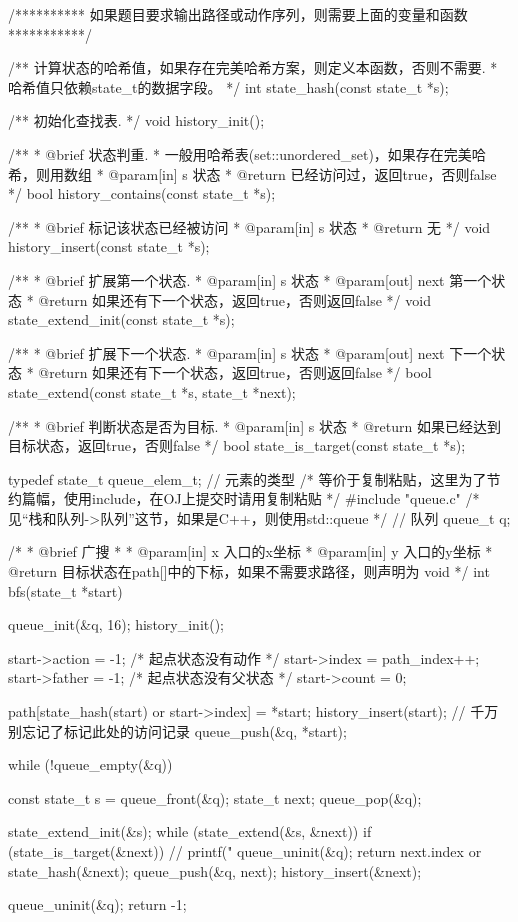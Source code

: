 \begin{Codex}[label=bfs_template.c]
/********** 如果题目要求输出路径或动作序列，则需要上面的变量和函数 ***********/

/** 计算状态的哈希值，如果存在完美哈希方案，则定义本函数，否则不需要.
 * 哈希值只依赖state_t的数据字段。
 */
int state_hash(const state_t *s);

/** 初始化查找表. */
void history_init();

/**
 * @brief 状态判重.
 * 一般用哈希表(set::unordered_set)，如果存在完美哈希，则用数组
 * @param[in] s 状态
 * @return 已经访问过，返回true，否则false
 */
bool history_contains(const state_t *s);

/**
 * @brief 标记该状态已经被访问
 * @param[in] s 状态
 * @return 无
 */
void history_insert(const state_t *s);

/**
 * @brief 扩展第一个状态.
 * @param[in] s 状态
 * @param[out] next 第一个状态
 * @return 如果还有下一个状态，返回true，否则返回false
 */
void state_extend_init(const state_t *s);

/**
 * @brief 扩展下一个状态.
 * @param[in] s 状态
 * @param[out] next 下一个状态
 * @return 如果还有下一个状态，返回true，否则返回false
 */
bool state_extend(const state_t *s, state_t *next);

/**
 * @brief 判断状态是否为目标.
 * @param[in] s 状态
 * @return 如果已经达到目标状态，返回true，否则false
 */
bool state_is_target(const state_t *s);

typedef state_t queue_elem_t; // 元素的类型
/* 等价于复制粘贴，这里为了节约篇幅，使用include，在OJ上提交时请用复制粘贴 */
#include "queue.c"  /* 见“栈和队列->队列”这节，如果是C++，则使用std::queue */
// 队列
queue_t q;

/*
 * @brief 广搜
 *
 * @param[in] x 入口的x坐标
 * @param[in] y 入口的y坐标
 * @return 目标状态在path[]中的下标，如果不需要求路径，则声明为 void
 */
int bfs(state_t *start) {
    queue_init(&q, 16);
    history_init();

    start->action = -1;   /* 起点状态没有动作 */
    start->index = path_index++;
    start->father = -1;   /* 起点状态没有父状态 */
    start->count = 0;

    path[state_hash(start) or start->index] = *start;
    history_insert(start); // 千万别忘记了标记此处的访问记录
    queue_push(&q, *start);

    while (!queue_empty(&q)) {
        const state_t s = queue_front(&q);
        state_t next;
        queue_pop(&q);

        state_extend_init(&s);
        while (state_extend(&s, &next)) {
            if (state_is_target(&next)) {
                // printf("%
                queue_uninit(&q);
                return next.index or state_hash(&next);
            }
            queue_push(&q, next);
            history_insert(&next);
        }
    }
    queue_uninit(&q);
    return -1;
}


\end{Codex}
